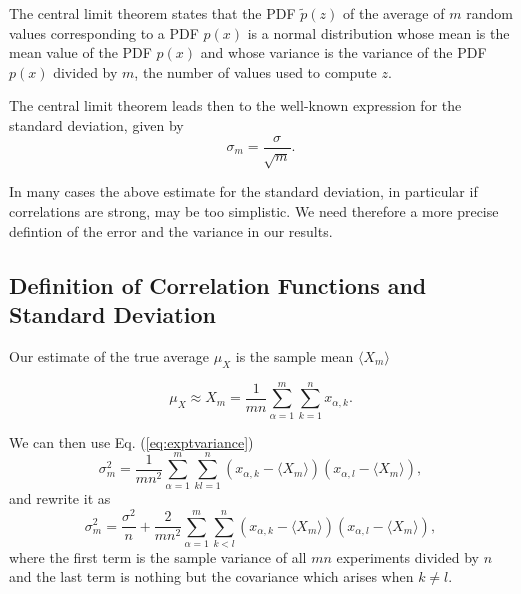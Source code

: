 \documentclass[%
oneside,                 %
final,                   %
10pt]{article}
\newenvironment{block_mdfboxadmon}[1][]{
\begin{block_mdfboxmdframed}[frametitle=#1]
}
{
\end{block_mdfboxmdframed}
}
\begin{document}
\begin{block_mdfboxadmon}[]

The central limit theorem states that the PDF $\tilde{p}(z)$ of
the average of $m$ random values corresponding to a PDF $p(x)$ 
is a normal distribution whose mean is the 
mean value of the PDF $p(x)$ and whose variance is the variance
of the PDF $p(x)$ divided by $m$, the number of values used to compute $z$.

The central limit theorem leads then to the well-known expression for the
standard deviation, given by
\begin{equation*}
    \sigma_m=
\frac{\sigma}{\sqrt{m}}.
\end{equation*}

In many cases the above estimate for the standard deviation, in particular if correlations are strong, may be too simplistic.  We need therefore a more precise defintion of the error and the variance in our results.
\end{block_mdfboxadmon} %



\subsection{Definition of Correlation Functions and Standard Deviation}

\begin{block_mdfboxadmon}[]
Our estimate of the true average $\mu_{X}$ is the sample mean $\langle X_m \rangle$

\begin{equation*}
\mu_{X}^{\phantom X} \approx X_m=\frac{1}{mn}\sum_{\alpha=1}^m\sum_{k=1}^n x_{\alpha,k}.
\end{equation*}


We can then use Eq. (\ref{eq:exptvariance})
\begin{equation*}
\sigma^2_m=\frac{1}{mn^2}\sum_{\alpha=1}^m\sum_{kl=1}^n (x_{\alpha,k}-\langle X_m \rangle)(x_{\alpha,l}-\langle X_m \rangle),
\end{equation*}
and rewrite it as
\begin{equation*}
\sigma^2_m=\frac{\sigma^2}{n}+\frac{2}{mn^2}\sum_{\alpha=1}^m\sum_{k<l}^n (x_{\alpha,k}-\langle X_m \rangle)(x_{\alpha,l}-\langle X_m \rangle),
\end{equation*}
where the first term is the sample variance of all $mn$ experiments divided by $n$
and the last term is nothing but the covariance which arises when $k\ne l$.
\end{block_mdfboxadmon} %
\end{document}

